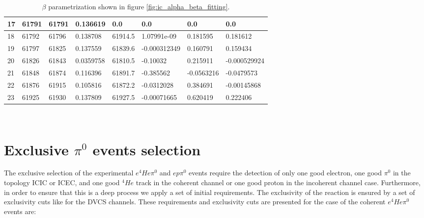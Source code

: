 \begin{itemize}
\begin {table}[!h]
\begin{center}
\begin{tabular}{|l|l|l|l|l|l|l|l|}
\hline
17 &    61791  &   61791    &  0.136619  &   0.0   &   0.0   &    0.0  &    0.0\\
\hline
18&   61792   &  61796 & 0.138708   &  61914.5   &   1.07991e-09     &  0.181595    &  0.181612\\
\hline
19 &  61797  &   61825  &    0.137559   &  61839.6 &     -0.000312349  &     0.160791&      0.159434\\
\hline
20  &61826   & 61843     & 0.0359758   &  61810.5   &   -0.10032      & 0.215911     & -0.000529924\\
\hline
21 & 61848  &  61874      &0.116396   &  61891.7   &   -0.385562     &  -0.0563216    &  -0.0479573\\
\hline
22&   61876  &   61915  &  0.105816  &   61872.2    &  -0.0312028     &  0.384691    &  -0.00145868\\
\hline
23 & 61925   &  61930    &  0.137809   &  61927.5    &  -0.00071665  &     0.620419   &   0.222406\\

\hline
\end{tabular}
\caption{$\beta$ parametrization shown in figure \ref{fig:ic_alpha_beta_fitting}.}
\label{Table:ic_beta_corrections}
\end{center}
\end{table}
\end{itemize}

~\newpage

\chapter{Exclusive $\pi^{0}$ events selection}\label{app:Exclusive_pi0_selection}

The exclusive selection of the experimental $e^{4}He\pi^{0}$ and $ep\pi^{0}$ events require the detection of only one good electron, one good $\pi^{0}$ in the topology ICIC or ICEC, and one good $^{4}He$ track in the coherent channel or one good proton in the incoherent channel case. Furthermore, in order to ensure that this is a deep process we apply a set of initial requirements. The exclusivity of the reaction is ensured by a set of exclusivity cuts like for the DVCS channels. These requirements and exclusivity cuts are presented for the case of the coherent $e^{4}He\pi^{0}$ events are:

